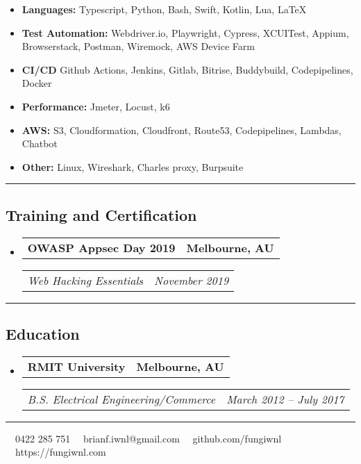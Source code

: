 \documentclass[11pt,letterpaper]{article}
\makeatletter
\newcommand{\headerrow}[2]
{\begin{tabular*}{\linewidth}{l@{\extracolsep{\fill}}r}
#1 &
#2 \\
\end{tabular*}}
\makeatother
\begin{document}
\begin{itemize}[leftmargin=1em,noitemsep]
	\item \textbf{Languages:}
	      Typescript, Python, Bash, Swift, Kotlin, Lua, \LaTeX
	\item \textbf{Test Automation:}
	    Webdriver.io, Playwright, Cypress, XCUITest, Appium, Browserstack, Postman, Wiremock, AWS Device Farm
	\item \textbf{CI/CD} Github Actions, Jenkins, Gitlab, Bitrise, Buddybuild, Codepipelines, Docker
	\item \textbf{Performance:} Jmeter, Locust, k6
    \item \textbf{AWS:} S3, Cloudformation, Cloudfront, Route53, Codepipelines, Lambdas, Chatbot
    \item \textbf{Other:} Linux, Wireshark, Charles proxy, Burpsuite
\end{itemize}

\hrule
\vspace{-1em}
\subsection*{\Large Training and Certification}

\begin{itemize}[leftmargin=1em]
	\parskip=0.1em
		
	\item
	      \headerrow
	      {\textbf{OWASP Appsec Day 2019}}
	      {\textbf{Melbourne, AU}}
	      \headerrow
	      {\emph{Web Hacking Essentials}}
	      {\emph{November 2019}}
	      	      
\end{itemize}

\hrule
\vspace{-1em}
\subsection*{\Large Education}

\begin{itemize}[leftmargin=1em]
	\parskip=0.1em
		
	\item
	      \headerrow
	      {\textbf{RMIT University}}
	      {\textbf{Melbourne, AU}}
	      \headerrow
	      {\emph{B.S. Electrical Engineering/Commerce}}
	      {\emph{March 2012 -- July 2017}}
	      	      
\end{itemize}

\hrule
\vspace{-1em}
\begin{center}
	\vspace{0.8cm}
	\raisebox{-0.2\height} {\Large \faPhoneSquare} \ \  0422 285 751 \hfill\raisebox{-0.2\height}{\Large \faEnvelopeSquare} \ \ brianf.iwnl@gmail.com \hfill \raisebox{-0.2\height}{\Large \faGithubSquare} \ \ github.com/fungiwnl \hfill \raisebox{-0.2\height}{\Large \faGlobe} \ \ https://fungiwnl.com
\end{center}
\end{document}
